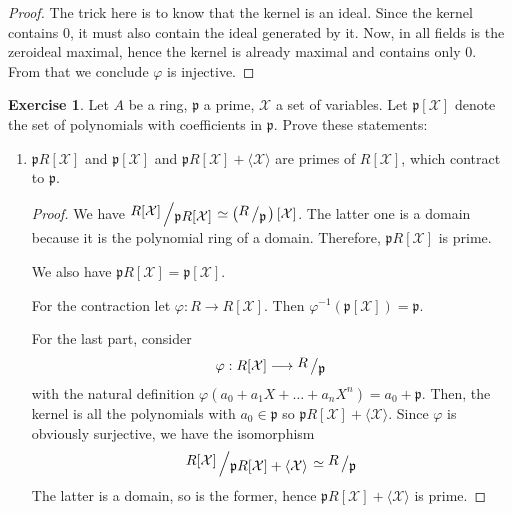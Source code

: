 \documentclass{book}
\theoremstyle{plain}
\theoremstyle{definition}
\newtheorem{exr}[thm]{Exercise}
\theoremstyle{custom_definition}
\newcommand{\bigslant}[2]{{\raisebox{.2em}{$#1$}\left/\raisebox{-.2em}{$#2$}\right.}}
\begin{document}
\begin{proof}
  The trick here is to know that the kernel is an ideal. Since the kernel contains \(0\), it must also contain the ideal generated by it. Now, in all fields is the zeroideal maximal, hence the kernel is already maximal and contains only \(0\). From that we conclude \(\varphi\) is injective.
\end{proof}

\begin{exr}
  Let \(A\) be a ring, \(\mathfrak{p}\) a prime, \(\mathcal{X}\) a set of variables. Let \(\mathfrak{p}[\mathcal{X}]\) denote the set of polynomials with coefficients in \(\mathfrak{p}\). Prove these statements:
  \begin{enumerate}
    \item \(\mathfrak{p}R[\mathcal{X}]\) and \(\mathfrak{p}[\mathcal{X}]\) and \(\mathfrak{p}R[\mathcal{X}] + \langle \mathcal{X} \rangle\) are primes of \(R[\mathcal{X}]\), which contract to \(\mathfrak{p}\).
    \begin{proof}
      We have \(\bigslant{R[\mathcal{X}]}{\mathfrak{p}R[\mathcal{X}]} \simeq \left(\bigslant{R}{\mathfrak{p}}\right)[\mathcal{X}]\). The latter one is a domain because it is the polynomial ring of a domain. Therefore, \(\mathfrak{p}R[\mathcal{X}]\) is prime.

      We also have \(\mathfrak{p}R[\mathcal{X}] = \mathfrak{p}[\mathcal{X}]\).

      For the contraction let \(\varphi: R \longrightarrow R[\mathcal{X}]\). Then \(\varphi^{-1} \left( \mathfrak{p}[\mathcal{X}] \right) = \mathfrak{p}\).

      For the last part, consider
      \begin{equation}
        \varphi: R[\mathcal{X}] \longrightarrow \bigslant{R}{\mathfrak{p}}
      \end{equation}
      with the natural definition \(\varphi\left(a_0 + a_1 X + \ldots + a_n X^n\right) = a_0 + \mathfrak{p}\). Then, the kernel is all the polynomials with \(a_0 \in \mathfrak{p}\) so \(\mathfrak{p}R[\mathcal{X}] + \langle \mathcal{X} \rangle\). Since \(\varphi\) is obviously surjective, we have the isomorphism
      \begin{equation}
        \bigslant{R[\mathcal{X}]}{\mathfrak{p}R[\mathcal{X}]+ \langle \mathcal{X} \rangle} \simeq \bigslant{R}{\mathfrak{p}}
      \end{equation}
      The latter is a domain, so is the former, hence \(\mathfrak{p}R[\mathcal{X}]+ \langle \mathcal{X} \rangle\) is prime.


\end{proof}
\end{enumerate}
\end{exr}
\end{document}
